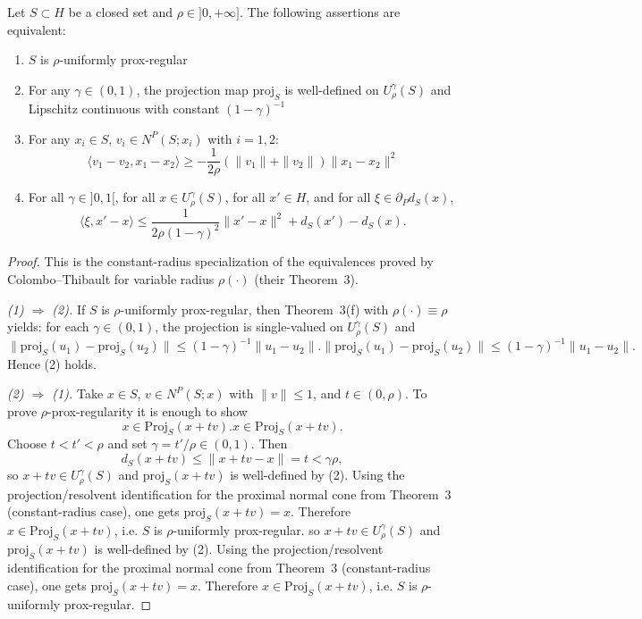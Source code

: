 \begin{proposition}
\label{prop:prox_regular_characterization}
\leanok
Let $S \subset H$ be a closed set and $\rho \in ]0, +\infty]$. The following assertions are equivalent:
\begin{enumerate}
\item $S$ is $\rho$-uniformly prox-regular
\item For any $\gamma \in (0,1)$, the projection map $\text{proj}_S$ is well-defined on $U_\rho^\gamma(S)$ and Lipschitz continuous with constant $(1-\gamma)^{-1}$
\item For any $x_i \in S$, $v_i \in N^P(S; x_i)$ with $i = 1, 2$:
$$\langle v_1 - v_2, x_1 - x_2 \rangle \ge -\frac{1}{2\rho} (\|v_1\| + \|v_2\|) \|x_1 - x_2\|^2$$
\item For all $\gamma \in ]0,1[$, for all $x \in U_\rho^\gamma(S)$, for all $x' \in H$, and for all $\xi \in \partial_P d_S(x)$,
$$\langle \xi, x' - x \rangle \le \frac{1}{2\rho(1-\gamma)^2}\|x' - x\|^2 + d_S(x') - d_S(x).$$
\end{enumerate}
\begin{proof}
This is the constant-radius specialization of the equivalences proved by Colombo--Thibault for variable radius $\rho(\cdot)$ (their Theorem~3).

\smallskip
\noindent\emph{(1) $\Rightarrow$ (2).}
If $S$ is $\rho$-uniformly prox-regular, then Theorem~3(f) with $\rho(\cdot)\equiv\rho$ yields: for each $\gamma\in(0,1)$, the projection is single-valued on $U_\rho^\gamma(S)$ and
$$
\|\text{proj}_S(u_1)-\text{proj}_S(u_2)\|\le (1-\gamma)^{-1}\|u_1-u_2\|.
\|\text{proj}_S(u_1)-\text{proj}_S(u_2)\|\le (1-\gamma)^{-1}\|u_1-u_2\|.
$$
Hence (2) holds.

\smallskip
\noindent\emph{(2) $\Rightarrow$ (1).}
Take $x\in S$, $v\in N^P(S;x)$ with $\|v\|\le 1$, and $t\in(0,\rho)$. To prove $\rho$-prox-regularity it is enough to show
$$
x\in \text{Proj}_S(x+tv).
x\in \text{Proj}_S(x+tv).
$$
Choose $t<t'<\rho$ and set $\gamma=t'/\rho\in(0,1)$. Then
$$
d_S(x+tv)\le \|x+tv-x\|=t<\gamma\rho,
$$
so $x+tv\in U_\rho^\gamma(S)$ and $\text{proj}_S(x+tv)$ is well-defined by (2). Using the projection/resolvent identification for the proximal normal cone from Theorem~3 (constant-radius case), one gets $\text{proj}_S(x+tv)=x$. Therefore $x\in\text{Proj}_S(x+tv)$, i.e. $S$ is $\rho$-uniformly prox-regular.
so $x+tv\in U_\rho^\gamma(S)$ and $\text{proj}_S(x+tv)$ is well-defined by (2). Using the projection/resolvent identification for the proximal normal cone from Theorem~3 (constant-radius case), one gets $\text{proj}_S(x+tv)=x$. Therefore $x\in\text{Proj}_S(x+tv)$, i.e. $S$ is $\rho$-uniformly prox-regular.


\end{proof}
\end{proposition}
